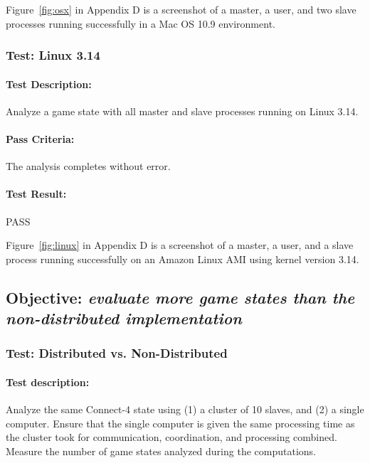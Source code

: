 \documentclass[pdftex,12pt,a4paper]{article}
\begin{document}
Figure~\ref{fig:osx} in Appendix D is a screenshot of a master, a user, and two slave processes running successfully in a Mac OS 10.9 environment.

\subsubsection{\textbf{Test:} Linux 3.14}

\paragraph{Test Description:} Analyze a game state with all master and slave processes running on Linux 3.14.

\paragraph{Pass Criteria:} The analysis completes without error.

\paragraph{Test Result:} PASS

Figure~\ref{fig:linux} in Appendix D is a screenshot of a master, a user, and a slave process running successfully on an Amazon Linux AMI using kernel version 3.14.



\subsection{\textbf{Objective:} \emph{evaluate more game states than the non-distributed implementation}}\label{sec:obj-number-analyzed}

\subsubsection{\textbf{Test:} Distributed vs. Non-Distributed}\label{sec:number-analyzed}

\paragraph{Test description:} Analyze the same Connect-4 state using (1) a cluster of 10 slaves, and (2) a single computer. Ensure that the single computer is given the same processing time as the cluster took for communication, coordination, and processing combined. Measure the number of game states analyzed during the computations.
\end{document}
